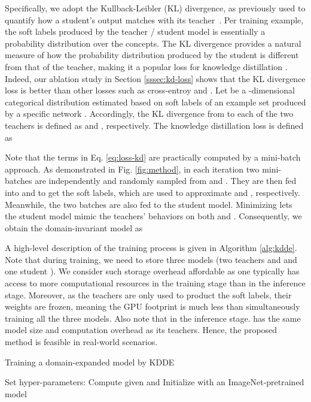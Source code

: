 Specifically, we adopt the Kullback-Leibler (KL) divergence, as previously used to quantify how a student's output matches with its teacher~\cite{nips15-kd,zhang2018deep_mutual}. Per training example, the soft labels produced by the teacher / student model is essentially a probability distribution over the  concepts. The KL divergence provides a natural measure of how the probability distribution produced by the student is different from that of the teacher, making it a popular loss for knowledge distillation \cite{nips15-kd,zhang2018deep_mutual,mirzadeh2020improved,tian2019contrastive,goldblum2020adversarially,zhang2019your,shi2019knowledge}. Indeed, our ablation study in Section \ref{sssec:kd-loss} shows that the KL divergence loss is better than other losses such as cross-entroy and . Let  be a -dimensional categorical distribution estimated based on soft labels of an example set  produced by a specific network . Accordingly, the KL divergence from  to each of the two teachers is defined as  and , respectively. 
The knowledge distillation loss  is defined as 


Note that the  terms in Eq. \ref{eq:loss-kd} are practically computed by a mini-batch approach. As demonstrated in Fig. \ref{fig:method}, in each iteration two mini-batches are independently and randomly sampled from  and . They are then fed into  and  to get the soft labels, which are used to approximate  and , respectively. Meanwhile, the two batches are also fed to the student model. Minimizing  lets the student model mimic the teachers' behaviors on both  and . 
Consequently, we obtain the domain-invariant model as 


A high-level description of the training process is given in Algorithm \ref{alg:kdde}. Note that during training, we need to store three models (two teachers  and  and one student ). We consider such storage overhead affordable as one typically has access to more computational resources in the training stage than in the inference stage. Moreover, as the teachers are only used to product the soft labels, their weights are frozen, meaning the GPU footprint is much less than simultaneously training all the three models. Also note that in the inference stage.  has the same model size and computation overhead as its teachers. Hence, the proposed method is feasible in real-world scenarios.

\begin{algorithm}
\caption{Training a domain-expanded model  by KDDE}
\label{alg:kdde}
\KwIn{}
\KwOut{}
Set hyper-parameters: \;
Compute  given  and  \;
Initialize {} with an ImageNet-pretrained model\;
\end{algorithm}
 
